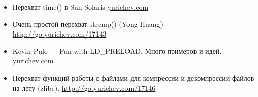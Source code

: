 \begin{itemize}
\item
Перехват time() в Sun Solaris \href{http://go.yurichev.com/17144}{yurichev.com}

\item
Очень простой перехват strcmp() (Yong Huang) 
\url{http://go.yurichev.com/17143}

\item
Kevin Pulo --- Fun with LD\_PRELOAD. Много примеров и идей.
\href{http://go.yurichev.com/17145}{yurichev.com}

\item
Перехват функций работы с файлами для компрессии и декомпрессии файлов на лету (zlibc). \url{http://go.yurichev.com/17146}

\end{itemize}
